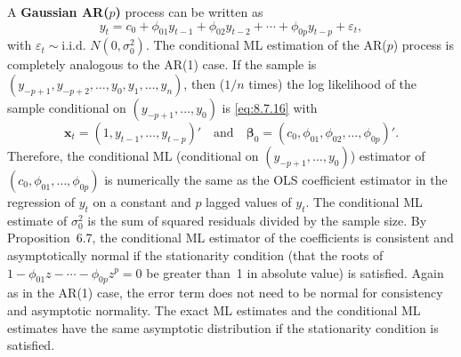 A \textbf{Gaussian AR($p$)} process can be written as
\begin{equation}
  y_t = c_0 + \phi_{01} y_{t-1} + \phi_{02} y_{t-2} + \cdots + \phi_{0p} y_{t-p}
  + \varepsilon_t,
  \label{eq:8.7.20} \tag{8.7.20}
\end{equation}
with $\varepsilon_t \sim \text{i.i.d.\ } N(0, \sigma_0^2)$. The conditional ML estimation of the AR($p$) process is
completely analogous to the AR(1) case. If the sample is $(y_{-p+1}, y_{-p+2}, \ldots, y_0,
y_1, \ldots, y_n)$, then ($1/n$ times) the log likelihood of the sample conditional on
$(y_{-p+1}, \ldots, y_0)$ is \eqref{eq:8.7.16} with
\[
  \mathbf{x}_t = (1, y_{t-1}, \ldots, y_{t-p})' \quad\text{and}\quad
  \boldsymbol{\beta}_0 = (c_0, \phi_{01}, \phi_{02}, \ldots, \phi_{0p})'.
\]
Therefore, the conditional ML (conditional on $(y_{-p+1}, \ldots, y_0)$) estimator
of $(c_0, \phi_{01}, \ldots, \phi_{0p})$ is numerically the same as the OLS coefficient estimator in
the regression of $y_t$ on a constant and $p$ lagged values of $y_t$. The conditional ML
estimate of $\sigma_0^2$ is the sum of squared residuals divided by the sample size. By
Proposition~6.7, the conditional ML estimator of the coefficients is consistent and
asymptotically normal if the stationarity condition (that the roots of
$1 - \phi_{01}z - \cdots - \phi_{0p}z^p = 0$ be greater than~1 in absolute value) is satisfied. Again as in the AR(1)
case, the error term does not need to be normal for consistency and asymptotic
normality. The exact ML estimates and the conditional ML estimates have the
same asymptotic distribution if the stationarity condition is satisfied.

